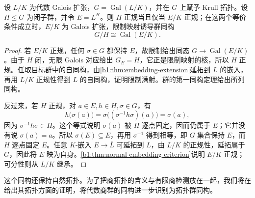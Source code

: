 \begin{theorem}\label{b1:thm:infinite-galois-quotient}
	设 \(L/K\) 为代数 Galois 扩张，\(G=\operatorname{Gal}(L/K)\)，并在 \(G\) 上赋予 Krull 拓扑。设 \(H\leq G\) 为闭子群，并令 \(E=L^H\)。则 \(H\) 正规当且仅当 \(E/K\) 正规；在这两个等价条件成立时，\(E/K\) 为 Galois 扩张，限制映射诱导群同构
	\[
		G/H\cong\operatorname{Gal}(E/K).
	\]
\end{theorem}
\begin{proof}
	若 \(E/K\) 正规，任何 \(\sigma\in G\) 都保持 \(E\)，故限制给出同态 \(G\rightarrow\operatorname{Gal}(E/K)\)。由于 \(H\) 闭，无限 Galois 对应给出 \(G_E=H\)，它正是限制映射的核，所以 \(H\) 正规。任取目标群中的自同构，由\cref{b1:thm:embedding-extension}延拓到 \(L\) 的嵌入，再用 \(L/K\) 正规性得到 \(L\) 的自同构，证明限制满射。群的第一同构定理给出所列同构。

	反过来，若 \(H\) 正规，对 \(a\in E,h\in H,\sigma\in G\)，有
	\[
		h\bigl(\sigma(a)\bigr) =\sigma\bigl((\sigma^{-1}h\sigma)(a)\bigr)=\sigma(a),
	\]
	因为 \(\sigma^{-1}h\sigma\in H\)。这个等式说明 \(\sigma(a)\) 被 \(H\) 逐点固定，因而仍属于 \(E\)；它并没有说 \(\sigma(a)=a\)。所以 \(\sigma(E)\subseteq E\)，再用 \(\sigma^{-1}\) 得到相等，即 \(G\) 集合保持 \(E\)，而 \(H\) 逐点固定 \(E\)。任意 \(K\)-嵌入 \(E\rightarrow\overline L\) 可延拓到 \(L\)，由 \(L/K\) 的正规性，延拓属于 \(G\)，因此将 \(E\) 映为自身。\cref{b1:thm:normal-embedding-criterion}说明 \(E/K\) 正规；可分性则从 \(L/K\) 继承。
\end{proof}
这个同构还保持自然拓扑。为了把商拓扑的含义与有限商检测放在一起，我们将在给出其拓扑方面的证明，将代数商群的同构进一步识别为拓扑群同构。

